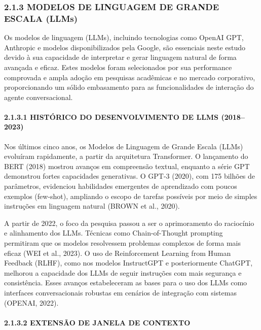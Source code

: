 \documentclass[
]{article}
\begin{document}
\subsubsection{2.1.3 MODELOS DE LINGUAGEM DE GRANDE ESCALA
(LLMs)}\label{modelos-de-linguagem-de-grande-escala-llms}

Os modelos de linguagem (LLMs), incluindo tecnologias como OpenAI GPT,
Anthropic e modelos disponibilizados pela Google, são essenciais neste
estudo devido à sua capacidade de interpretar e gerar linguagem natural
de forma avançada e eficaz. Estes modelos foram selecionados por sua
performance comprovada e ampla adoção em pesquisas acadêmicas e no
mercado corporativo, proporcionando um sólido embasamento para as
funcionalidades de interação do agente conversacional.

\paragraph{2.1.3.1 HISTÓRICO DO DESENVOLVIMENTO DE LLMS
(2018--2023)}\label{histuxf3rico-do-desenvolvimento-de-llms-20182023}

Nos últimos cinco anos, os Modelos de Linguagem de Grande Escala (LLMs)
evoluíram rapidamente, a partir da arquitetura Transformer. O lançamento
do BERT (2018) mostrou avanços em compreensão textual, enquanto a série
GPT demonstrou fortes capacidades generativas. O GPT-3 (2020), com 175
bilhões de parâmetros, evidenciou habilidades emergentes de aprendizado
com poucos exemplos (few-shot), ampliando o escopo de tarefas possíveis
por meio de simples instruções em linguagem natural (BROWN et al.,
2020).

A partir de 2022, o foco da pesquisa passou a ser o aprimoramento do
raciocínio e alinhamento dos LLMs. Técnicas como Chain-of-Thought
prompting permitiram que os modelos resolvessem problemas complexos de
forma mais eficaz (WEI et al., 2023). O uso de Reinforcement Learning
from Human Feedback (RLHF), como nos modelos InstructGPT e
posteriormente ChatGPT, melhorou a capacidade dos LLMs de seguir
instruções com mais segurança e consistência. Esses avanços
estabeleceram as bases para o uso dos LLMs como interfaces
conversacionais robustas em cenários de integração com sistemas (OPENAI,
2022).

\paragraph{2.1.3.2 EXTENSÃO DE JANELA DE
CONTEXTO}\label{extensuxe3o-de-janela-de-contexto}
\end{document}
